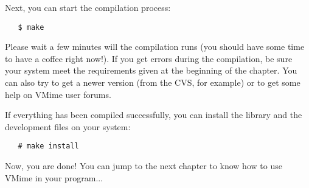 Next, you can start the compilation process:

\begin{verbatim}
   $ make
\end{verbatim}

Please wait a few minutes will the compilation runs (you should have some time
to have a coffee right now!). If you get errors during the compilation, be
sure your system meet the requirements given at the beginning of the chapter.
You can also try to get a newer version (from the CVS, for example) or to
get some help on VMime user forums.

If everything has been compiled successfully, you can install the library and
the development files on your system:

\begin{verbatim}
   # make install
\end{verbatim}


Now, you are done! You can jump to the next chapter to know how to use VMime
in your program...

